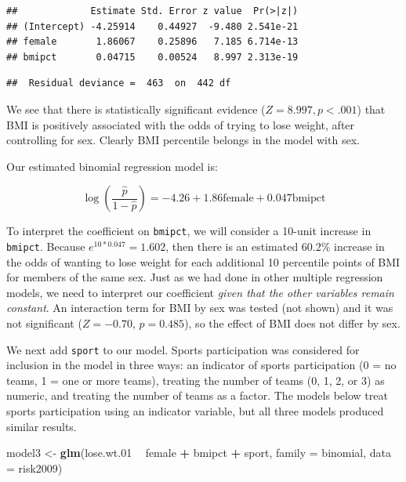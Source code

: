 \documentclass[
]{krantz}
\newenvironment{Shaded}{\begin{snugshade}}{\end{snugshade}}
\newcommand{\DataTypeTok}[1]{\textcolor[rgb]{0.27,0.27,0.27}{#1}}
\newcommand{\FloatTok}[1]{\textcolor[rgb]{0.06,0.06,0.06}{#1}}
\newcommand{\KeywordTok}[1]{\textcolor[rgb]{0.27,0.27,0.27}{\textbf{#1}}}
\newcommand{\NormalTok}[1]{#1}
\newcommand{\OperatorTok}[1]{\textcolor[rgb]{0.43,0.43,0.43}{\textbf{#1}}}
\newcommand{\StringTok}[1]{\textcolor[rgb]{0.5,0.5,0.5}{#1}}
\begin{document}
\begin{verbatim}
##             Estimate Std. Error z value  Pr(>|z|)
## (Intercept) -4.25914    0.44927  -9.480 2.541e-21
## female       1.86067    0.25896   7.185 6.714e-13
## bmipct       0.04715    0.00524   8.997 2.313e-19
\end{verbatim}

\begin{verbatim}
##  Residual deviance =  463  on  442 df
\end{verbatim}

We see that there is statistically significant evidence (\(Z=8.997, p<.001\)) that BMI is positively associated with the odds of trying to lose weight, after controlling for sex. Clearly BMI percentile belongs in the model with sex.

Our estimated binomial regression model is:

\[\log\left(\frac{\hat{p}}{1-\hat{p}}\right)= -4.26+1.86\textrm{female}+0.047\textrm{bmipct}\]

To interpret the coefficient on \texttt{bmipct}, we will consider a 10-unit increase in \texttt{bmipct}. Because \(e^{10*0.047}=1.602\), then there is an estimated 60.2\% increase in the odds of wanting to lose weight for each additional 10 percentile points of BMI for members of the same sex. Just as we had done in other multiple regression models, we need to interpret our coefficient \emph{given that the other variables remain constant}. An interaction term for BMI by sex was tested (not shown) and it was not significant (\(Z=-0.70\), \(p=0.485\)), so the effect of BMI does not differ by sex.

We next add \texttt{sport} to our model. Sports participation was considered for inclusion in the model in three ways: an indicator of sports participation (0 = no teams, 1 = one or more teams), treating the number of teams (0, 1, 2, or 3) as numeric, and treating the number of teams as a factor. The models below treat sports participation using an indicator variable, but all three models produced similar results.

\begin{Shaded}
\begin{Highlighting}[]
\NormalTok{model3 <-}\StringTok{ }\KeywordTok{glm}\NormalTok{(lose.wt}\FloatTok{.01} \OperatorTok{~}\StringTok{ }\NormalTok{female }\OperatorTok{+}\StringTok{ }\NormalTok{bmipct }\OperatorTok{+}\StringTok{ }\NormalTok{sport, }
              \DataTypeTok{family =}\NormalTok{ binomial, }\DataTypeTok{data =}\NormalTok{ risk2009)}
\end{Highlighting}
\end{Shaded}
\end{document}

